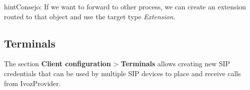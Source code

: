 \documentclass[letterpaper,10pt,spanish]{sphinxmanual}
\begin{document}
\begin{notice}{hint}{Consejo:}
If we want to forward to other process, we can create an extension
routed to that object and use the target type \emph{Extension}.
\end{notice}


\subsection{Terminals}
\label{administration_portal/client/vpbx/terminals:terminals}\label{administration_portal/client/vpbx/terminals::doc}\label{administration_portal/client/vpbx/terminals:id1}
The section \textbf{Client configuration} \textgreater{} \textbf{Terminals} allows creating new
SIP credentials that can be used by multiple SIP devices to place and receive
calls from IvozProvider.
\end{document}
